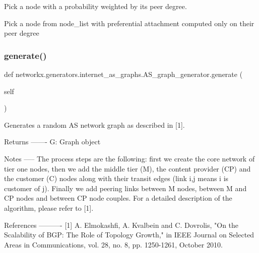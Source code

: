 \begin{DoxyVerb}Pick a node with a probability weighted by its peer degree.

Pick a node from node_list with preferential attachment
computed only on their peer degree
\end{DoxyVerb}
 \mbox{\label{classnetworkx_1_1generators_1_1internet__as__graphs_1_1AS__graph__generator_afd3a91b998cd59fec28ea990c7cab2df}} 
\subsubsection{\texorpdfstring{generate()}{generate()}}
{\footnotesize\ttfamily def networkx.\+generators.\+internet\+\_\+as\+\_\+graphs.\+A\+S\+\_\+graph\+\_\+generator.\+generate (\begin{DoxyParamCaption}\item[{}]{self }\end{DoxyParamCaption})}

\begin{DoxyVerb}Generates a random AS network graph as described in [1].

Returns
-------
G: Graph object

Notes
-----
The process steps are the following: first we create the core network
of tier one nodes, then we add the middle tier (M), the content
provider (CP) and the customer (C) nodes along with their transit edges
(link i,j means i is customer of j). Finally we add peering links
between M nodes, between M and CP nodes and between CP node couples.
For a detailed description of the algorithm, please refer to [1].

References
----------
[1] A. Elmokashfi, A. Kvalbein and C. Dovrolis, "On the Scalability of
BGP: The Role of Topology Growth," in IEEE Journal on Selected Areas
in Communications, vol. 28, no. 8, pp. 1250-1261, October 2010.
\end{DoxyVerb}
 \mbox{\label{classnetworkx_1_1generators_1_1internet__as__graphs_1_1AS__graph__generator_abbba507ad5095d4a488373a938cd7a91}} 
